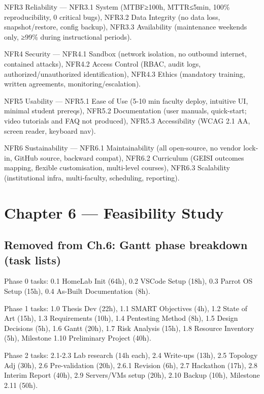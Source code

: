 \documentclass[a4paper,11pt]{article}
\begin{document}
NFR3 Reliability --- NFR3.1 System (MTBF≥100h, MTTR≤5min, 100\% reproducibility, 0
critical bugs), NFR3.2 Data Integrity (no data loss, snapshot/restore, config backup),
NFR3.3 Availability (maintenance weekends only, ≥99\% during instructional periods).

NFR4 Security --- NFR4.1 Sandbox (network isolation, no outbound internet, contained attacks),
NFR4.2 Access Control (RBAC, audit logs, authorized/unauthorized identification),
NFR4.3 Ethics (mandatory training, written agreements, monitoring/escalation).

NFR5 Usability --- NFR5.1 Ease of Use (5-10 min faculty deploy, intuitive UI, minimal
student prereqs), NFR5.2 Documentation (user manuals, quick-start; video tutorials and
FAQ not produced), NFR5.3 Accessibility (WCAG 2.1 AA, screen reader, keyboard nav).

NFR6 Sustainability --- NFR6.1 Maintainability (all open-source, no vendor lock-in,
GitHub source, backward compat), NFR6.2 Curriculum (GEISI outcomes mapping, flexible
customisation, multi-level courses), NFR6.3 Scalability (institutional infra, multi-faculty,
scheduling, reporting).

\section{Chapter 6 --- Feasibility Study}

\subsection{Removed from Ch.6: Gantt phase breakdown (task lists)}


Phase 0 tasks: 0.1 HomeLab Init (64h), 0.2 VSCode Setup (18h),
0.3 Parrot OS Setup (15h), 0.4 As-Built Documentation (8h).

Phase 1 tasks: 1.0 Thesis Dev (22h), 1.1 SMART Objectives (4h),
1.2 State of Art (15h), 1.3 Requirements (10h), 1.4 Pentesting Method (8h),
1.5 Design Decisions (5h), 1.6 Gantt (20h), 1.7 Risk Analysis (15h),
1.8 Resource Inventory (5h), Milestone 1.10 Preliminary Project (40h).

Phase 2 tasks: 2.1-2.3 Lab research (14h each), 2.4 Write-ups (13h),
2.5 Topology Adj (30h), 2.6 Pre-validation (20h), 2.6.1 Revision (6h),
2.7 Hackathon (17h), 2.8 Interim Report (40h), 2.9 Servers/VMs setup (20h),
2.10 Backup (10h), Milestone 2.11 (50h).
\end{document}
